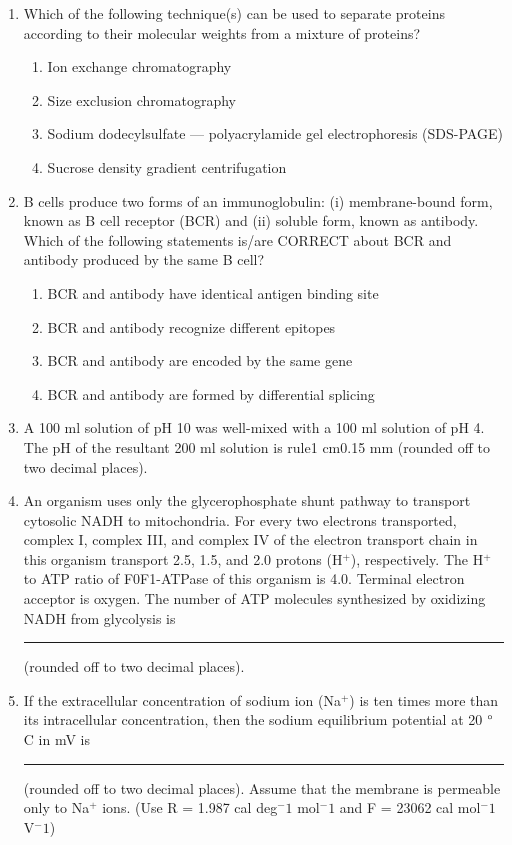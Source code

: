 \documentclass[journal,12pt,onecolumn]{IEEEtran}
\begin{document}
\begin{enumerate}
    \item Which of the following technique(s) can be used to separate proteins according to their molecular weights from a mixture of proteins?
    \begin{enumerate}
        \item Ion exchange chromatography
        \item Size exclusion chromatography
        \item Sodium dodecylsulfate --- polyacrylamide gel electrophoresis (SDS-PAGE)
        \item Sucrose density gradient centrifugation
    \end{enumerate}

    \item B cells produce two forms of an immunoglobulin: (i) membrane-bound form, known as B cell receptor (BCR) and (ii) soluble form, known as antibody. Which of the following statements is/are CORRECT about BCR and antibody produced by the same B cell?
    \begin{enumerate}
        \item BCR and antibody have identical antigen binding site
        \item BCR and antibody recognize different epitopes
        \item BCR and antibody are encoded by the same gene
        \item BCR and antibody are formed by differential splicing
    \end{enumerate}

    \item A 100 ml solution of pH 10 was well-mixed with a 100 ml solution of pH 4. The pH of the resultant 200 ml solution is rule{1 cm}{0.15 mm} (rounded off to two decimal places).

    \item An organism uses only the glycerophosphate shunt pathway to transport cytosolic NADH to mitochondria. For every two electrons transported, complex I, complex III, and complex IV of the electron transport chain in this organism transport 2.5, 1.5, and 2.0 protons (H$^+$), respectively. The H$^+$ to ATP ratio of F0F1-ATPase of this organism is 4.0. Terminal electron acceptor is oxygen.
    The number of ATP molecules synthesized by oxidizing NADH from glycolysis is \rule{1 cm}{0.15 mm} (rounded off to two decimal places).

    \item If the extracellular concentration of sodium ion (Na$^+$) is ten times more than its intracellular concentration, then the sodium equilibrium potential at 20 $\degree$C in mV is \rule{1 cm}{0.15 mm} (rounded off to two decimal places). Assume that the membrane is permeable only to Na$^+$ ions. (Use R = 1.987 cal deg$^-1$ mol$^-1$ and F = 23062 cal mol$^-1$ V$^-1$)


\end{enumerate}
\end{document}
